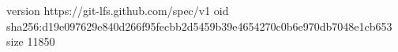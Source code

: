 version https://git-lfs.github.com/spec/v1
oid sha256:d19e097629e840d266f95fecbb2d5459b39e4654270c0b6e970db7048e1cb653
size 11850
